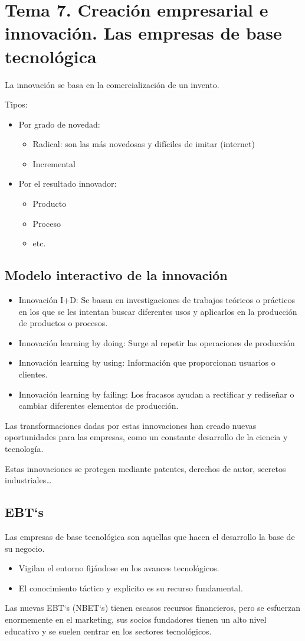 \documentclass[12pt, twoside, openright]{report} %
\begin{document}
\chapter{Tema 7. Creación empresarial e innovación. Las empresas de base tecnológica}
La innovación se basa en la comercialización de un invento.

Tipos:
\begin{itemize}
	\item Por grado de novedad:
	      \begin{itemize}
		      \item Radical: son las más novedosas y difíciles de imitar (internet)
		      \item Incremental
	      \end{itemize}
	\item Por el resultado innovador:
	      \begin{itemize}
		      \item Producto
		      \item Proceso
		      \item etc.
	      \end{itemize}
\end{itemize}

\section{Modelo interactivo de la innovación}
\begin{itemize}
	\item Innovación I+D: Se basan en investigaciones de trabajos teóricos o prácticos en los que se les intentan buscar diferentes usos y aplicarlos en la producción de productos o procesos.
	\item Innovación learning by doing: Surge al repetir las operaciones de producción
	\item Innovación learning by using: Información que proporcionan usuarios o clientes.
	\item Innovación learning by failing: Los fracasos ayudan a rectificar y rediseñar o cambiar diferentes elementos de producción.
\end{itemize}


Las transformaciones dadas por estas innovaciones han creado nuevas oportunidades para las
empresas, como un constante desarrollo de la ciencia y tecnología.

Estas innovaciones se protegen mediante patentes, derechos de autor, secretos industriales…
\pagebreak
\section{EBT`s}
Las empresas de base tecnológica son aquellas que hacen el desarrollo la base de su negocio.
\begin{itemize}
	\item Vigilan el entorno fijándose en los avances tecnológicos.
	\item El conocimiento táctico y explicito es su recurso fundamental.
\end{itemize}

Las nuevas EBT`s (NBET`s) tienen escasos recursos financieros, pero se esfuerzan enormemente en el
marketing, sus socios fundadores tienen un alto nivel educativo y se suelen centrar en los sectores
tecnológicos.
\end{document}
